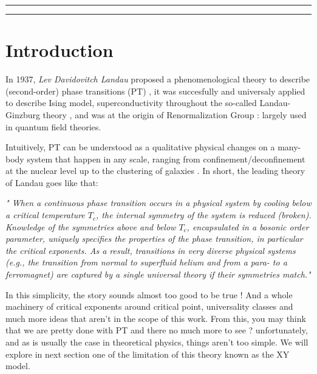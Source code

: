 \documentclass[a4paper,11pt]{article}
\begin{document}
\pagedegarde

\setcounter{page}{2}

\ifnotoc\else
\iftoccontinuous\else\newpage\fi
\beforetochook\hrule
\tableofcontents
\afterTocSpace
\hrule
\afterTocRuleSpace
\fi


\section{Introduction}

In 1937, \textit{Lev Davidovitch Landau} proposed a phenomenological theory to describe (second-order) phase transitions (PT) \cite{landau1937theory}, it was succesfully and universaly applied to describe Ising model, superconductivity throughout the so-called Landau-Ginzburg theory \cite{ginzburg2009theory}, and was at the origin of Renormalization Group \cite{kadanoff1966scaling,wilson1975renormalization} : largely used in quantum field theories.


Intuitively, PT can be understood as a qualitative physical changes on a many-body system that happen in any scale, ranging from confinement/deconfinement at the nuclear level \cite{wilson1974confinement} up to the clustering of galaxies \cite{cerruti2001clustering}. In short, the leading theory of Landau goes like that: 

\begin{center}\textit{"
When a continuous phase transition occurs in a physical system by cooling below a critical temperature $T_c$, the internal symmetry of the system is reduced (broken). Knowledge of the symmetries above and below $T_c$, encapsulated in a bosonic order parameter, uniquely specifies the properties of the phase transition, in particular the critical exponents. As a result, transitions in very diverse physical systems (e.g., the transition from normal to superfluid helium and from a para- to a ferromagnet) are captured by a single universal theory if their symmetries match."}\cite{Alsolami2012Auth}
\end{center}


In this simplicity, the story sounds almost too good to be true ! And a whole machinery of critical exponents around critical point, universality classes and much more ideas that aren't in the scope of this work. From this, you may think that we are pretty done with PT and there no much more to see ? unfortunately, and as is usually the case in theoretical physics, things aren't too simple. We will explore in next section one of the limitation of this theory known as the XY model.
\end{document}
